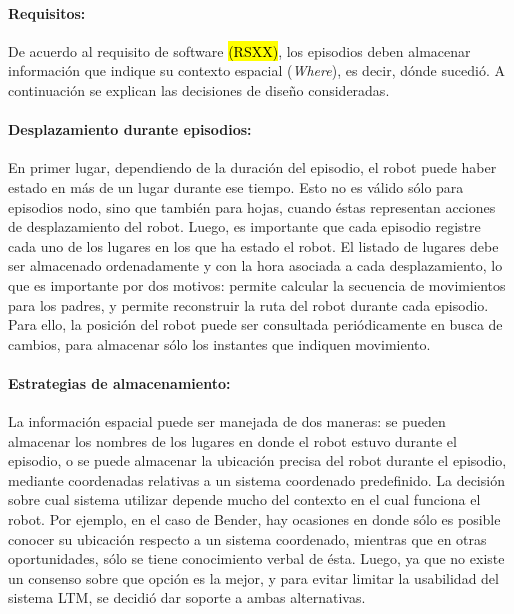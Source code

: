 \paragraph{Requisitos:}
De acuerdo al requisito de software \hl{(RSXX)}, los episodios deben almacenar información que indique su contexto espacial (\textit{Where}), es decir, dónde sucedió. A continuación se explican las decisiones de diseño consideradas.

\paragraph{Desplazamiento durante episodios:}
En primer lugar, dependiendo de la duración del episodio, el robot puede haber estado en más de un lugar durante ese tiempo. Esto no es válido sólo para episodios nodo, sino que también para hojas, cuando éstas representan acciones de desplazamiento del robot. Luego, es importante que cada episodio registre cada uno de los lugares en los que ha estado el robot. El listado de lugares debe ser almacenado ordenadamente y con la hora asociada a cada desplazamiento, lo que es importante por dos motivos: permite calcular la secuencia de movimientos para los padres, y permite reconstruir la ruta del robot durante cada episodio. Para ello, la posición del robot puede ser consultada periódicamente en busca de cambios, para almacenar sólo los instantes que indiquen movimiento.


\paragraph{Estrategias de almacenamiento:}
La información espacial puede ser manejada de dos maneras: se pueden almacenar los nombres de los lugares en donde el robot estuvo durante el episodio, o se puede almacenar la ubicación precisa del robot durante el episodio, mediante coordenadas relativas a un sistema coordenado predefinido. La decisión sobre cual sistema utilizar depende mucho del contexto en el cual funciona el robot. Por ejemplo, en el caso de Bender, hay ocasiones en donde sólo es posible conocer su ubicación respecto a un sistema coordenado, mientras que en otras oportunidades, sólo se tiene conocimiento verbal de ésta. Luego, ya que no existe un consenso sobre que opción es la mejor, y para evitar limitar la usabilidad del sistema LTM, se decidió dar soporte a ambas alternativas.

